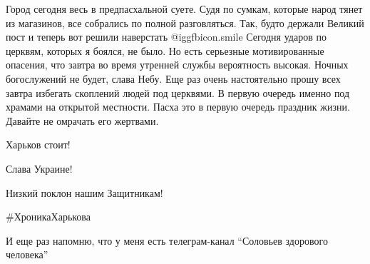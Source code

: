 Город сегодня весь в предпасхальной суете. Судя по сумкам, которые народ тянет
из магазинов, все собрались по полной разговляться. Так, будто держали Великий
пост и теперь вот решили наверстать  @igg{fbicon.smile}  Сегодня ударов по церквям, которых я
боялся, не было. Но есть серьезные мотивированные опасения, что завтра во время
утренней службы вероятность высокая. Ночных богослужений не будет, слава Небу.
Еще раз очень настоятельно прошу всех завтра избегать скоплений людей под
церквями. В первую очередь именно под храмами на открытой местности. Пасха это
в первую очередь праздник жизни. Давайте не омрачать его жертвами. 

Харьков стоит!

Слава Украине!

Низкий поклон нашим Защитникам!

\#ХроникаХарькова

И еще раз напомню, что у меня есть телеграм-канал \enquote{Соловьев здорового
человека}

